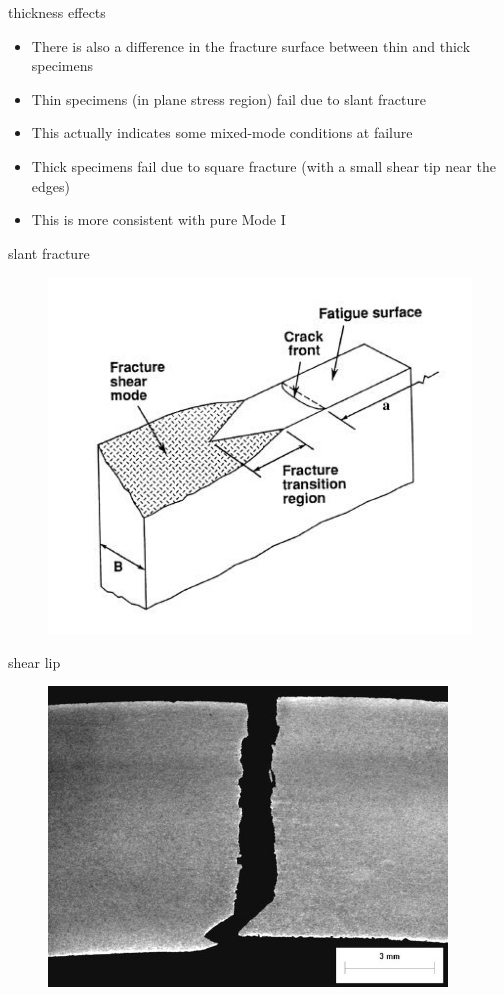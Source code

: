 \documentclass[10pt]{beamer}
\begin{document}
\begin{frame}{thickness effects}
	\begin{itemize}[<+->]
		\item There is also a difference in the fracture surface between thin and thick specimens
		\item Thin specimens (in plane stress region) fail due to slant fracture
		\item This actually indicates some mixed-mode conditions at failure
		\item Thick specimens fail due to square fracture (with a small shear tip near the edges)
		\item This is more consistent with pure Mode I
	\end{itemize}
\end{frame}

\begin{frame}{slant fracture}
\begin{figure}
\centering
\includegraphics[width=0.7\linewidth]{slant}
\label{fig:slant}
\end{figure}
\end{frame}

\begin{frame}{shear lip}
\begin{figure}
\centering
\includegraphics[width=0.7\linewidth]{shear_lip}
\label{fig:shear_lip}
\end{figure}
\end{frame}
\end{document}
